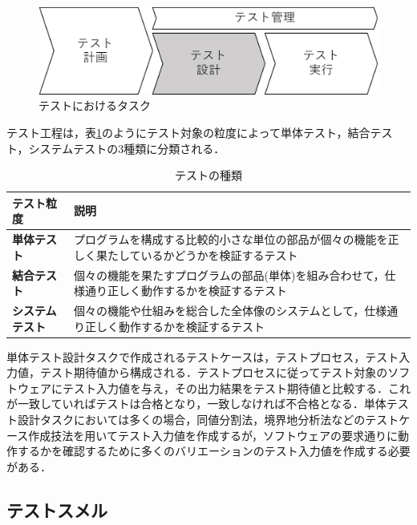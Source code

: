 \documentclass[12pt]{jarticle} %
\begin{document}
\begin{figure}[htbp]
  \begin{center}
    \includegraphics[clip,width=12cm]{test-task.pdf}
    \caption{テストにおけるタスク}
    \label{fig:1}
  \end{center}
\end{figure}

テスト工程は，表\ref{test-variety}のようにテスト対象の粒度によって単体テスト，結合テスト，システムテストの3種類に分類される．

\begin{table}[t]
\caption{テストの種類}
\label{test-variety}
\begin{tabular}{|l|p{11cm}|}
\hline
\textbf{テスト粒度}                   & \textbf{説明}                                                                                                       \\ \hline
\textbf{単体テスト}        & プログラムを構成する比較的小さな単位の部品が個々の機能を正しく果たしているかどうかを検証するテスト \\ \hline
\textbf{結合テスト} & 個々の機能を果たすプログラムの部品(単体)を組み合わせて，仕様通り正しく動作するかを検証するテスト\\ \hline
\textbf{システムテスト}            & 個々の機能や仕組みを総合した全体像のシステムとして，仕様通り正しく動作するかを検証するテスト \\ \hline
\end{tabular}
\end{table}

単体テスト設計タスクで作成されるテストケースは，テストプロセス，テスト入力値，テスト期待値から構成される．テストプロセスに従ってテスト対象のソフトウェアにテスト入力値を与え，その出力結果をテスト期待値と比較する．これが一致していればテストは合格となり，一致しなければ不合格となる．単体テスト設計タスクにおいては多くの場合，同値分割法，境界地分析法などのテストケース作成技法を用いてテスト入力値を作成するが，ソフトウェアの要求通りに動作するかを確認するために多くのバリエーションのテスト入力値を作成する必要がある．

\subsection{テストスメル}
\end{document}
